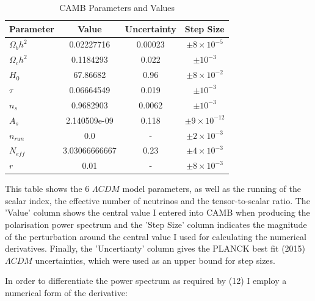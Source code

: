 \begin{table}[h]
\centering
\caption{CAMB Parameters and Values}
\label{my-label}
\begin{tabular}{l|l|l|l}
Parameter & \multicolumn{1}{c|}{Value} & Uncertainty & Step Size \\ \hline
$\Omega_{b}h^{2}$ & \multicolumn{1}{c|}{0.02227716} & \multicolumn{1}{c|}{0.00023} & \multicolumn{1}{c}{$\pm 8 \times 10^{-5}$}  \\
$\Omega_{c}h^{2}$ & \multicolumn{1}{c|}{0.1184293} & \multicolumn{1}{c|}{0.022} & \multicolumn{1}{c}{$\pm 10^{-3}$}  \\
$H_0$ & \multicolumn{1}{c|}{67.86682} & \multicolumn{1}{c|}{0.96} & \multicolumn{1}{c}{$\pm 8 \times 10^{-2}$}  \\
$\tau$ & \multicolumn{1}{c|}{0.06664549} & \multicolumn{1}{c|}{0.019} & \multicolumn{1}{c}{$\pm 10^{-3}$}  \\
$n_s$ & \multicolumn{1}{c|}{0.9682903} & \multicolumn{1}{c|}{0.0062} & \multicolumn{1}{c}{$\pm 10^{-3}$}  \\
$A_s$ & \multicolumn{1}{c|}{2.140509e-09} & \multicolumn{1}{c|}{0.118} & \multicolumn{1}{c}{$\pm 9 \times 10^{-12}$}  \\
$n_{run}$ & \multicolumn{1}{c|}{0.0} & \multicolumn{1}{c|}{-} & \multicolumn{1}{c}{$\pm 2 \times 10^{-3}$}  \\
$N_{eff}$ & \multicolumn{1}{c|}{3.03066666667} & \multicolumn{1}{c|}{0.23} & \multicolumn{1}{c}{$\pm 4 \times 10^{-3}$}  \\
$r$ & \multicolumn{1}{c|}{0.01} & \multicolumn{1}{c|}{-} & \multicolumn{1}{c}{$\pm 8 \times 10^{-3}$} 
\end{tabular}

\bigskip
This table shows the 6 $\Lambda CDM$ model parameters, as well as the running of the scalar index, the effective number of neutrinos and the tensor-to-scalar ratio. The 'Value' column shows the central value I entered into CAMB when producing the polarisation power spectrum and the 'Step Size' column indicates the magnitude of the perturbation around the central value I used for calculating the numerical derivatives. Finally, the 'Uncertianty' column gives the PLANCK best fit (2015) \cite{Ade:2015xua} $\Lambda CDM$ uncertainties, which were used as an upper bound for step sizes.
\end{table}
 

In order to differentiate the power spectrum as required by (12) I employ a numerical form of the derivative:

